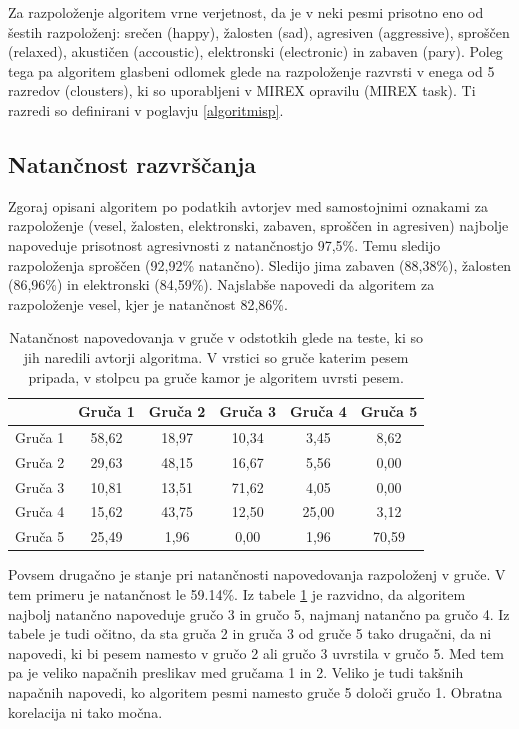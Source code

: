 \documentclass[a4paper, 12pt]{book}
\begin{document}
{Za razpoloženje algoritem vrne verjetnost, da je v neki pesmi prisotno eno od šestih razpoloženj: srečen (happy), žalosten (sad), agresiven (aggressive), sproščen (relaxed), akustičen (accoustic), elektronski (electronic) in zabaven (pary). Poleg tega pa algoritem glasbeni odlomek glede na razpoloženje razvrsti v enega od 5 razredov (clousters), ki so uporabljeni v MIREX opravilu (MIREX task). Ti razredi so definirani v poglavju \ref{algoritmisp}.

\subsection{Natančnost razvrščanja}
\label{natancnostessentia}

Zgoraj opisani algoritem po podatkih avtorjev med samostojnimi oznakami za razpoloženje (vesel, žalosten, elektronski, zabaven, sproščen in agresiven) najbolje napoveduje prisotnost agresivnosti z natančnostjo 97,5\%. Temu sledijo razpoloženja sproščen (92,92\% natančno). Sledijo jima zabaven (88,38\%), žalosten (86,96\%) in elektronski (84,59\%). Najslabše napovedi da algoritem za razpoloženje vesel, kjer je natančnost 82,86\%.

\begin{table}[htb]
\begin{center}
\caption{Natančnost napovedovanja v gruče v odstotkih glede na teste, ki so jih naredili avtorji algoritma. V vrstici so gruče katerim pesem pripada, v stolpcu pa gruče kamor je algoritem uvrsti pesem.}
\begin{tabular}{|l|c|c|c|c|c|}
\hline
 & Gruča 1 & Gruča 2 & Gruča 3 & Gruča 4 & Gruča 5 \\ \hline
Gruča 1 & 58,62 & 18,97	& 10,34 & 3,45 & 8,62 \\ \hline
Gruča 2 & 29,63 & 48,15 & 16,67 & 5,56 & 0,00 \\ \hline
Gruča 3 & 10,81 & 13,51 & 71,62 & 4,05 & 0,00 \\ \hline
Gruča 4 & 15,62	& 43,75	& 12,50	& 25,00	& 3,12 \\ \hline
Gruča 5 & 25,49	& 1,96	& 0,00 & 1,96 & 70,59 \\ \hline

\hline
\end{tabular}
\label{natancnost_gruce}
\end{center}
\end{table}

Povsem drugačno je stanje pri natančnosti napovedovanja razpoloženj v gruče. V tem primeru je natančnost le  59.14\%. Iz tabele \ref{natancnost_gruce} je razvidno, da algoritem najbolj natančno napoveduje gručo 3 in gručo 5, najmanj natančno pa gručo 4. Iz tabele je tudi očitno, da sta gruča 2 in gruča 3 od gruče 5 tako drugačni, da ni napovedi, ki bi pesem namesto v gručo 2 ali gručo 3 uvrstila v gručo 5. Med tem pa je veliko napačnih preslikav med gručama 1 in 2. Veliko je tudi takšnih napačnih napovedi, ko algoritem pesmi namesto gruče 5 določi gručo 1. Obratna korelacija ni tako močna. 

}
\end{document}
